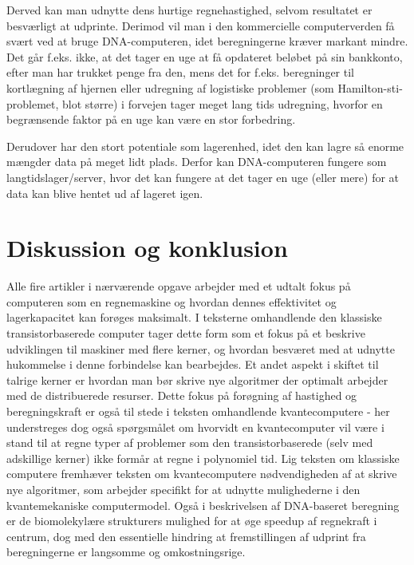 \documentclass[10pt,a4paper]{article}
\begin{document}
Derved kan man udnytte dens hurtige regnehastighed, selvom resultatet er
besværligt at udprinte. Derimod vil man i den kommercielle computerverden få
svært ved at bruge DNA-computeren, idet beregningerne kræver markant mindre. Det
går f.eks. ikke, at det tager en uge at få opdateret beløbet på sin bankkonto,
efter man har trukket penge fra den, mens det for f.eks. beregninger til
kortlægning af hjernen eller udregning af logistiske problemer (som
Hamilton-sti-problemet, blot større) i forvejen tager meget lang tids
udregning, hvorfor en begrænsende faktor på en uge kan være en stor forbedring.

Derudover har den stort potentiale som lagerenhed, idet den kan lagre så enorme
mængder data på meget lidt plads. Derfor kan DNA-computeren fungere
som langtidslager/server, hvor det kan fungere at det tager en uge (eller
mere) for at data kan blive hentet ud af lageret igen.

\section{Diskussion og konklusion}
Alle fire artikler i nærværende opgave arbejder med et udtalt fokus på
computeren som en regnemaskine og hvordan dennes effektivitet og lagerkapacitet kan 
forøges maksimalt. I teksterne omhandlende den klassiske transistorbaserede
computer tager dette form som et fokus på et beskrive udviklingen til maskiner
med flere kerner, og hvordan besværet med at udnytte hukommelse i denne forbindelse
kan bearbejdes. Et andet aspekt i skiftet til talrige kerner er hvordan man bør
skrive nye algoritmer der optimalt arbejder med de distribuerede resurser. 
Dette fokus på forøgning af hastighed og beregningskraft er også til stede i
teksten omhandlende kvantecomputere - her understreges dog også spørgsmålet om 
hvorvidt en kvantecomputer vil være i stand til at regne typer af problemer som 
den transistorbaserede (selv med adskillige kerner) ikke formår at regne i 
polynomiel tid. Lig teksten om klassiske computere fremhæver teksten om 
kvantecomputere nødvendigheden af at skrive nye algoritmer, som arbejder 
specifikt for at udnytte mulighederne i den kvantemekaniske computermodel. 
Også i beskrivelsen af DNA-baseret beregning er de biomolekylære strukturers
mulighed for at øge speedup af regnekraft i centrum, dog med den essentielle
hindring at fremstillingen af udprint fra beregningerne er langsomme og 
omkostningsrige. 
\end{document}
